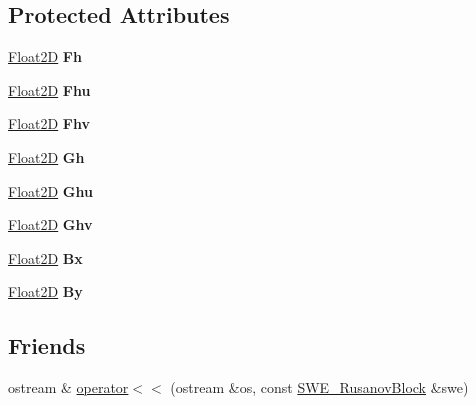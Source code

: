 \subsection*{Protected Attributes}
\begin{DoxyCompactItemize}
\item 
\hypertarget{classSWE__RusanovBlock_a13e147a6a4f8b39e1a95f37372a04d5b}{\hyperlink{classFloat2D}{Float2\-D} {\bfseries Fh}}\label{classSWE__RusanovBlock_a13e147a6a4f8b39e1a95f37372a04d5b}

\item 
\hypertarget{classSWE__RusanovBlock_a945f257acfa7b05dd0989c9525160b0b}{\hyperlink{classFloat2D}{Float2\-D} {\bfseries Fhu}}\label{classSWE__RusanovBlock_a945f257acfa7b05dd0989c9525160b0b}

\item 
\hypertarget{classSWE__RusanovBlock_a788982f2b64f97d271291ef7df669c57}{\hyperlink{classFloat2D}{Float2\-D} {\bfseries Fhv}}\label{classSWE__RusanovBlock_a788982f2b64f97d271291ef7df669c57}

\item 
\hypertarget{classSWE__RusanovBlock_aaa1d9c2b8f3dc1afe0f818bade7c3940}{\hyperlink{classFloat2D}{Float2\-D} {\bfseries Gh}}\label{classSWE__RusanovBlock_aaa1d9c2b8f3dc1afe0f818bade7c3940}

\item 
\hypertarget{classSWE__RusanovBlock_af479e7882925550951da40ce85736f83}{\hyperlink{classFloat2D}{Float2\-D} {\bfseries Ghu}}\label{classSWE__RusanovBlock_af479e7882925550951da40ce85736f83}

\item 
\hypertarget{classSWE__RusanovBlock_a2f856e0d68708748451c9ca1f166aa79}{\hyperlink{classFloat2D}{Float2\-D} {\bfseries Ghv}}\label{classSWE__RusanovBlock_a2f856e0d68708748451c9ca1f166aa79}

\item 
\hypertarget{classSWE__RusanovBlock_af6f73bf8459849ad75c1d7e70b279710}{\hyperlink{classFloat2D}{Float2\-D} {\bfseries Bx}}\label{classSWE__RusanovBlock_af6f73bf8459849ad75c1d7e70b279710}

\item 
\hypertarget{classSWE__RusanovBlock_a0c044eadcc80059b8708cf8f8c77add1}{\hyperlink{classFloat2D}{Float2\-D} {\bfseries By}}\label{classSWE__RusanovBlock_a0c044eadcc80059b8708cf8f8c77add1}

\end{DoxyCompactItemize}
\subsection*{Friends}
\begin{DoxyCompactItemize}
\item 
ostream \& \hyperlink{classSWE__RusanovBlock_a11f96afabd5e590e50d491568b96503a}{operator$<$$<$} (ostream \&os, const \hyperlink{classSWE__RusanovBlock}{S\-W\-E\-\_\-\-Rusanov\-Block} \&swe)
\end{DoxyCompactItemize}

